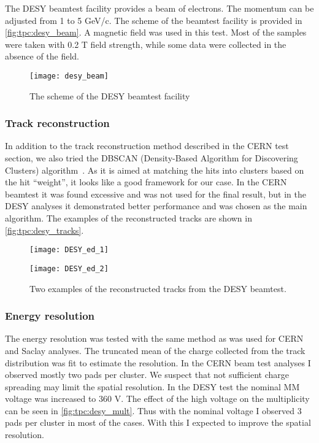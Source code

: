 \documentclass[../main.tex]{subfiles}
\begin{document}
The DESY beamtest facility provides a beam of electrons. The momentum can be adjusted from 1 to 5 GeV/c. The scheme of the beamtest facility is provided in \autoref{fig:tpc:desy_beam}. A magnetic field was used in this test. Most of the samples were taken with 0.2 T field strength, while some data were collected in the absence of the field.

\begin{figure}[!ht]
  \centering
  \texttt{[image: desy\_beam]}
  \caption{The scheme of the DESY beamtest facility}
  \label{fig:tpc:desy_beam}
\end{figure}

\subsubsection{Track reconstruction}
In addition to the track reconstruction method described in the CERN test section, we also tried the DBSCAN (Density-Based Algorithm for Discovering Clusters) algorithm~\cite{Ester1996}. As it is aimed at matching the hits into clusters based on the hit ``weight'', it looks like a good framework for our case. In the CERN beamtest it was found excessive and was not used for the final result, but in the DESY analyses it demonstrated better performance and was chosen as the main algorithm. The examples of the reconstructed tracks are shown in \autoref{fig:tpc:desy_tracks}.

\begin{figure}[!ht]
  \centering
  \begin{minipage}{0.49\linewidth}
    \centering
    \texttt{[image: DESY\_ed\_1]}
  \end{minipage}
  \begin{minipage}{0.49\linewidth}
    \centering
    \texttt{[image: DESY\_ed\_2]}
  \end{minipage}
  \caption{Two examples of the reconstructed tracks from the DESY beamtest.}
  \label{fig:tpc:desy_tracks}
\end{figure}

\subsubsection{Energy resolution}
The energy resolution was tested with the same method as was used for CERN and Saclay analyses. The truncated mean of the charge collected from the track distribution was fit to estimate the resolution. In the CERN beam test analyses I observed mostly two pads per cluster. We suspect that not sufficient charge spreading may limit the spatial resolution. In the DESY test the nominal MM voltage was increased to 360 V. The effect of the high voltage on the multiplicity can be seen in \autoref{fig:tpc:desy_mult}. Thus with the nominal voltage I observed 3 pads per cluster in most of the cases. With this I expected to improve the spatial resolution.
\end{document}

